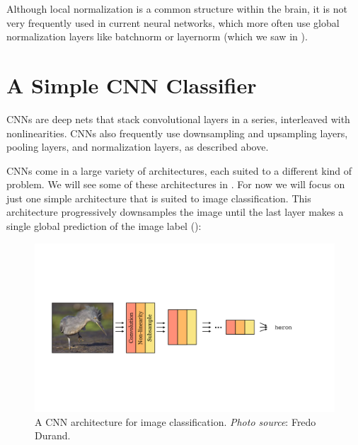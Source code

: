 Although local normalization is a common structure within the brain, it is not very frequently used in current neural networks, which more often use global normalization layers like batchnorm or layernorm (which we saw in \chap{\ref{chapter:neural_nets}}).


\section{A Simple CNN Classifier}
\label{sec:convolutional_neural_nets:simple_CNN}

CNNs are deep nets that stack convolutional layers in a series, interleaved with nonlinearities. CNNs also frequently use downsampling and upsampling layers, pooling layers, and normalization layers, as described above.

CNNs come in a large variety of architectures, each suited to a different kind of problem. We will see some of these architectures in \sect{\ref{sec:convolutional_neural_nets:popular_architectures}}. For now we will focus on just one simple architecture that is suited to image classification. This architecture progressively downsamples the image until the last layer makes a single global prediction of the image label (\fig{\ref{fig:convolutional_neural_nets:convnet_motif}}):
\begin{figure}[h]
\centerline{
    \includegraphics[width=1.0\linewidth]{./figures/convolutional_neural_nets/convnet_motif.pdf}}
    \caption{A CNN architecture for image classification. {\em Photo source}: Fredo Durand.}
    \label{fig:convolutional_neural_nets:convnet_motif}
\end{figure}

